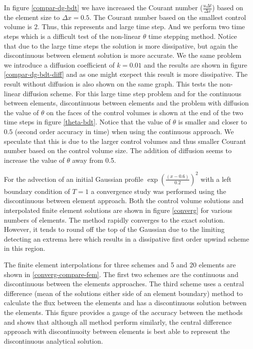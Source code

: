In figure \ref{compar-dg-bdt} we have increased the Courant number ($\frac{u \Delta t}{\Delta x}$)  based on the
element size to ${\Delta x}=0.5$. The Courant number based on the smallest
control volume is $2$. Thus, this represents and large time step.
And we perform two time steps which is a difficult test
of the non-linear $\theta$ time stepping method.
Notice that due to the large time
steps the solution is more dissipative, but again the
discontinuous between element solution is more accurate.
We the same problem we introduce a diffusion coefficient
of $k=0.01$ and the results are shown in figure
\ref{compar-dg-bdt-diff} and
as one might exepect this result is more dissipative.
The result without diffusion is also shown on the same graph.
This tests the non-linear diffusion scheme.
For this large time step problem and for the continuous between
elements, discontinuous between elements and the problem with diffusion
the value of $\theta$ on the faces of the control volumes is shown
at the end of the two time steps in figure \ref{theta-bdt}.
Notice that the value of $\theta$ is smaller and closer to $0.5$
(second order accuracy in time) when using the continuous approach.
We speculate that this is due to the larger control volumes and
thus smaller Courant number based on the control volume size.
The addition of diffusion seems to increase the value of $\theta$
away from 0.5.

For the advection of an initial Gaussian
profile $\exp{( \frac{(x-0.6)}{0.2} )^2}$
with a left boundary condition of $T=1$ a convergence study was performed using
the discontinuous between element approach. Both the
control volume solutions and interpolated finite element solutions
are shown in figure \ref{converg} for various numbers of elements.
The method rapidly converges to the exact solution. However, it tends
to round off the top of the Gaussian due to the limiting detecting an
extrema here which results in a dissipative first order upwind scheme
in this region.

The finite element interpolations for three schemes and
5 and 20 elements are shown in \ref{converg-compare-fem}.
The first two schemes are the continuous and discontinuous between
the elements approaches.
The third scheme uses a central difference (mean of the solutions
either side of an element boundary) method to calculate the
flux between the elements and has a discontinuous solution between
the elements. This figure provides a gauge of the accuracy between
the methods and shows that although all method perform similarly,
the central difference approach with discontinuoity between
elements is best able to represent the discontinuous analytical solution.


